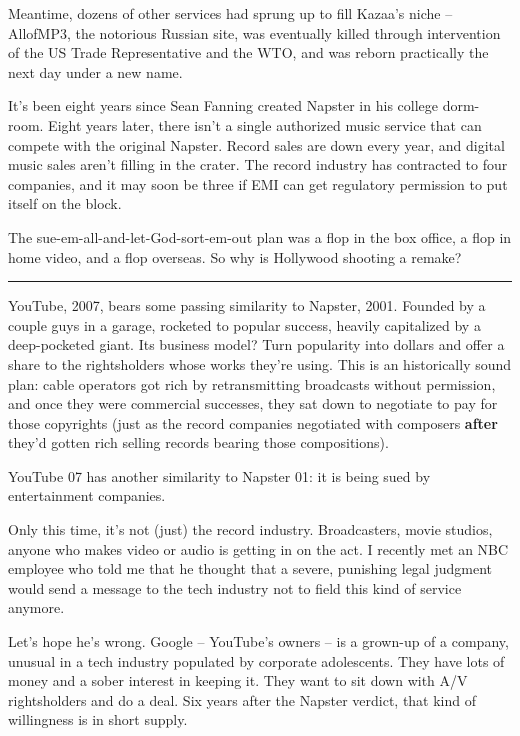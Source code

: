 Meantime, dozens of other services had sprung up to fill Kazaa's
niche -- AllofMP3, the notorious Russian site, was eventually
killed through intervention of the US Trade Representative and the
WTO, and was reborn practically the next day under a new name.

It's been eight years since Sean Fanning created Napster in his
college dorm-room. Eight years later, there isn't a single
authorized music service that can compete with the original
Napster. Record sales are down every year, and digital music sales
aren't filling in the crater. The record industry has contracted to
four companies, and it may soon be three if EMI can get regulatory
permission to put itself on the block.

The sue-em-all-and-let-God-sort-em-out plan was a flop in the box
office, a flop in home video, and a flop overseas. So why is
Hollywood shooting a remake?

\begin{center}\rule{3in}{0.4pt}\end{center}

YouTube, 2007, bears some passing similarity to Napster, 2001.
Founded by a couple guys in a garage, rocketed to popular success,
heavily capitalized by a deep-pocketed giant. Its business model?
Turn popularity into dollars and offer a share to the rightsholders
whose works they're using. This is an historically sound plan:
cable operators got rich by retransmitting broadcasts without
permission, and once they were commercial successes, they sat down
to negotiate to pay for those copyrights (just as the record
companies negotiated with composers \textbf{after} they'd gotten
rich selling records bearing those compositions).

YouTube 07 has another similarity to Napster 01: it is being sued
by entertainment companies.

Only this time, it's not (just) the record industry. Broadcasters,
movie studios, anyone who makes video or audio is getting in on the
act. I recently met an NBC employee who told me that he thought
that a severe, punishing legal judgment would send a message to the
tech industry not to field this kind of service anymore.

Let's hope he's wrong. Google -- YouTube's owners -- is a grown-up
of a company, unusual in a tech industry populated by corporate
adolescents. They have lots of money and a sober interest in
keeping it. They want to sit down with A/V rightsholders and do a
deal. Six years after the Napster verdict, that kind of willingness
is in short supply.

